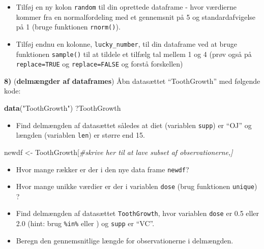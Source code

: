 \documentclass[
]{book}
\newenvironment{Shaded}{\begin{snugshade}}{\end{snugshade}}
\newcommand{\CommentTok}[1]{\textcolor[rgb]{0.56,0.35,0.01}{\textit{#1}}}
\newcommand{\FunctionTok}[1]{\textcolor[rgb]{0.13,0.29,0.53}{\textbf{#1}}}
\newcommand{\NormalTok}[1]{#1}
\newcommand{\OtherTok}[1]{\textcolor[rgb]{0.56,0.35,0.01}{#1}}
\newcommand{\SpecialCharTok}[1]{\textcolor[rgb]{0.81,0.36,0.00}{\textbf{#1}}}
\newcommand{\StringTok}[1]{\textcolor[rgb]{0.31,0.60,0.02}{#1}}
\providecommand{\tightlist}{%
  \setlength{\itemsep}{0pt}\setlength{\parskip}{0pt}}
\begin{document}
\begin{itemize}
\tightlist
\item
  Tilføj en ny kolon \texttt{random} til din oprettede dataframe - hvor værdierne kommer fra en normalfordeling med et gennemsnit på 5 og standardafvigelse på 1 (bruge funktionen \texttt{rnorm()}).
\end{itemize}

\begin{Shaded}
\end{Shaded}

\begin{itemize}
\tightlist
\item
  Tilføj endnu en kolonne, \texttt{lucky\_number}, til din dataframe ved at bruge funktionen \texttt{sample()} til at tildele et tilfælg tal mellem 1 og 4 (prøv også på \texttt{replace=TRUE} og \texttt{replace=FALSE} og forstå forskellen)
\end{itemize}

\textbf{8)} (\textbf{delmængder af dataframes}) Åbn datasættet ``ToothGrowth'' med følgende kode:

\begin{Shaded}
\begin{Highlighting}[]
\FunctionTok{data}\NormalTok{(}\StringTok{"ToothGrowth"}\NormalTok{)}
\NormalTok{?ToothGrowth}
\end{Highlighting}
\end{Shaded}

\begin{itemize}
\tightlist
\item
  Find delmængden af datasættet således at diet (variablen \texttt{supp}) er ``OJ'' og længden (variablen \texttt{len}) er større end 15.
\end{itemize}

\begin{Shaded}
\begin{Highlighting}[]
\NormalTok{newdf }\OtherTok{\textless{}{-}}\NormalTok{ ToothGrowth[}\CommentTok{\#skrive her til at lave subset af observationerne,]}
\end{Highlighting}
\end{Shaded}

\begin{itemize}
\tightlist
\item
  Hvor mange rækker er der i den nye data frame \texttt{newdf}?
\item
  Hvor mange unikke værdier er der i variablen \texttt{dose} (brug funktionen \texttt{unique}) ?
\item
  Find delmængden af datasættet \texttt{ToothGrowth}, hvor variablen \texttt{dose} er 0.5 eller 2.0 (hint: brug \texttt{\%in\%} eller \texttt{\textbar{}}) og \texttt{supp} er ``VC''.
\item
  Beregn den gennemsnitlige længde for observationerne i delmængden.
\end{itemize}
\end{document}
